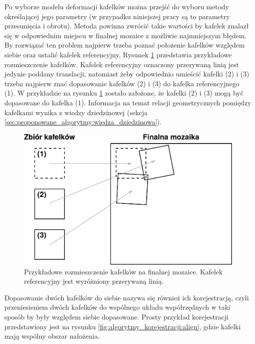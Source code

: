 Po wyborze modelu deformacji kafelków można przejść do wyboru metody określającej jego parametry (w przypadku niniejszej pracy są to parametry przesunięcia i obrotu). Metoda powinna zwrócić takie wartości by kafelek znalazł się w odpowiednim miejscu w finalnej mozaice z możliwie najmniejszym błędem. By rozwiązać ten problem najpierw trzeba poznać położenie kafelków względem siebie oraz ustalić kafelek referencyjny. Rysunek \ref{fig:algorytmy_korejestracji:reference_tile} przedstawia przykładowe rozmieszczenie kafelków. Kafelek referencyjny oznaczony przerywaną linią jest jedynie poddany translacji, natomiast żeby odpowiednio umieścić kafelki (2) i (3) trzeba najpierw znać dopasowanie kafelków (2) i (3) do kafelka referencyjnego (1). W przykładzie na rysunku \ref{fig:algorytmy_korejestracji:reference_tile} zostało założone, że kafelki (2) i (3) mogą być dopasowane do kafelka (1). Informacja na temat relacji geometrycznych pomiędzy kafelkami wynika z wiedzy dziedzinowej (sekcja \ref{sec:proponowane_algorytmy:wiedza_dziedzinowa}).

\begin{figure}[H]
  \centering
  \includegraphics[width=\textwidth]{gfx/reference_tile}
  \caption{Przykładowe rozmieszczenie kafelków na finalnej mozaice. Kafelek referencyjny jest wyróżniony przerywaną linią.}
  \label{fig:algorytmy_korejestracji:reference_tile}
\end{figure}

Dopasowanie dwóch kafelków do siebie nazywa się również ich korejestracją, czyli przeniesieniem dwóch kafelków do wspólnego układu współrzędnych w taki sposób by były względem siebie dopasowane. Prosty przykład korejestracji przedstawiony jest na rysunku \ref{fig:algorytmy_korejestracji:align}, gdzie kafelki mają wspólny obszar nałożenia.


